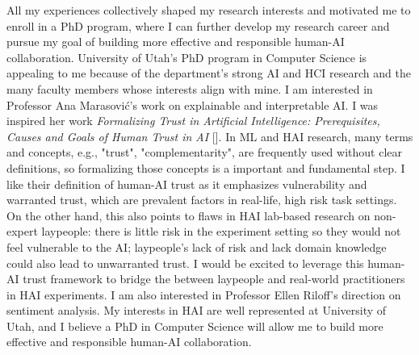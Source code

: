 
All my experiences collectively shaped my research interests and motivated me to enroll in a PhD program, where I can further develop my research career and pursue my goal of building more effective and responsible human-AI collaboration. 
University of Utah's PhD program in Computer Science is appealing to me because of the department's strong AI and HCI research and the many faculty members whose interests align with mine. 
I am interested in Professor Ana Marasović's work on explainable and interpretable AI. I was inspired her work \textit{Formalizing Trust in Artificial Intelligence: Prerequisites, Causes and Goals of Human Trust in AI} []. In ML and HAI research, many terms and concepts, e.g., "trust", "complementarity", are frequently used without clear definitions, so formalizing those concepts is a important and fundamental step. 
I like their definition of human-AI trust as it emphasizes vulnerability and warranted trust, which are prevalent factors in real-life, high risk task settings. On the other hand, this also points to flaws in HAI lab-based research on non-expert laypeople: there is little risk in the experiment setting so they would not feel vulnerable to the AI; laypeople's lack of risk and lack domain knowledge could also lead to unwarranted trust. I would be excited to leverage this human-AI trust framework to bridge the between laypeople and real-world practitioners in HAI experiments.
I am also interested in Professor Ellen Riloff’s direction on sentiment analysis.
My interests in HAI are well represented at University of Utah, and I believe a PhD in Computer Science will allow me to build more effective and responsible human-AI collaboration.
